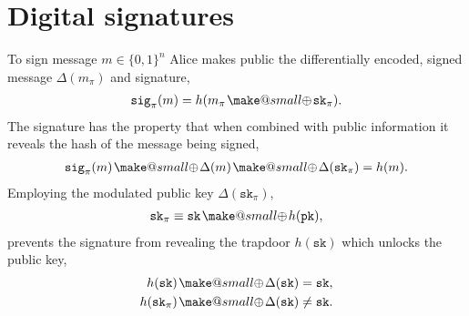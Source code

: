 \documentclass[twocolumn, aps, amsmath, amssymb, nofootinbib, superscriptaddress, longbibliography, doublefloatfix, table-of-contents, eqsecnum, rmp]{revtex4-2}
\makeatletter
\newcommand{\soplus}{{{\hspace{1pt}}{\mathbin{\mathpalette\make@small\oplus}}}{\hspace{1pt}}}
\newcommand{\make@small}[2]{%
  \vcenter{\hbox{%
    \scalebox{0.6}{$\m@th#1#2$}%
  }}%
}
\makeatother
\begin{document}
%
%
%

\section{Digital signatures}

To sign message \mbox{$m\in\{0,1\}^n$} Alice makes public the differentially encoded, signed message $\Delta(m_\pi)$ and signature,
\begin{align}
	 \mathtt{sig}_\pi(m) = h(m_\pi \soplus \mathtt{sk}_\pi).
\end{align}
The signature has the property that when combined with public information it reveals the hash of the message being signed,
\begin{align}
	 \mathtt{sig}_\pi(m) \soplus \Delta(m) \soplus \Delta(\mathtt{sk}_\pi) = h(m).
\end{align}
Employing the modulated public key $\Delta(\mathtt{sk}_\pi)$,
\begin{align}
	\mathtt{sk}_\pi \equiv \mathtt{sk} \soplus h(\mathtt{pk}),
\end{align}
prevents the signature from revealing the trapdoor $h(\mathtt{sk})$ which unlocks the public key,
\begin{align}
	h(\mathtt{sk}) \soplus \Delta(\mathtt{sk}) &= \mathtt{sk},\nonumber\\
	h(\mathtt{sk}_\pi) \soplus \Delta(\mathtt{sk}) &\neq \mathtt{sk}.
\end{align}

\end{document}
